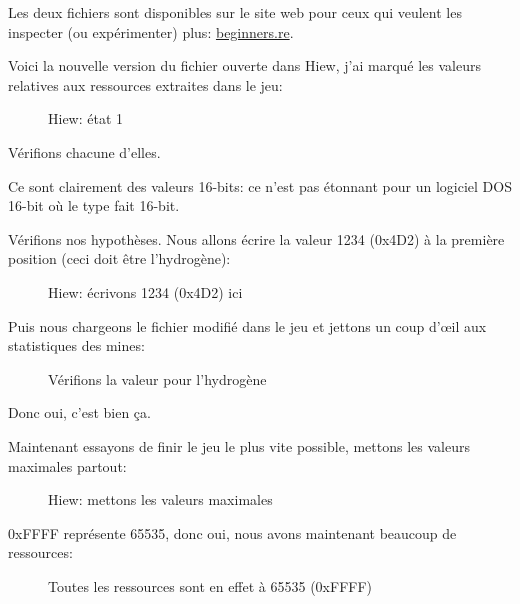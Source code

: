 Les deux fichiers sont disponibles sur le site web pour ceux qui veulent les inspecter
(ou expérimenter) plus:
\href{http://beginners.re/examples/millenium_DOS_game/}{beginners.re}.

\clearpage
Voici la nouvelle version du fichier ouverte dans Hiew, j'ai marqué les valeurs relatives
aux ressources extraites dans le jeu:

\begin{figure}[H]
\centering
{}
\caption{Hiew: état 1}
\label{fig:mill_hiew3}
\end{figure}

Vérifions chacune d'elles.

Ce sont clairement des valeurs 16-bits: ce n'est pas étonnant pour un logiciel DOS
16-bit où le type \Tint fait 16-bit.

\clearpage
Vérifions nos hypothèses.
Nous allons écrire la valeur 1234 (0x4D2) à la première position (ceci doit être
l'hydrogène):

\begin{figure}[H]
\centering
{}
\caption{Hiew: écrivons 1234 (0x4D2) ici}
\label{fig:mill_hiew4}
\end{figure}

Puis nous chargeons le fichier modifié dans le jeu et jettons un coup d'\oe{}il aux
statistiques des mines:

\begin{figure}[H]
\centering
{}
\caption{Vérifions la valeur pour l'hydrogène}
\label{fig:mill_5}
\end{figure}

Donc oui, c'est bien ça.

\clearpage
Maintenant essayons de finir le jeu le plus vite possible, mettons les valeurs maximales
partout:

\begin{figure}[H]
\centering
{}
\caption{Hiew: mettons les valeurs maximales}
\label{fig:mill_hiew7}
\end{figure}

0xFFFF représente 65535, donc oui, nous avons maintenant beaucoup de ressources:

\begin{figure}[H]
\centering
{}
\caption{Toutes les ressources sont en effet à 65535 (0xFFFF)}
\label{fig:mill_6}
\end{figure}

